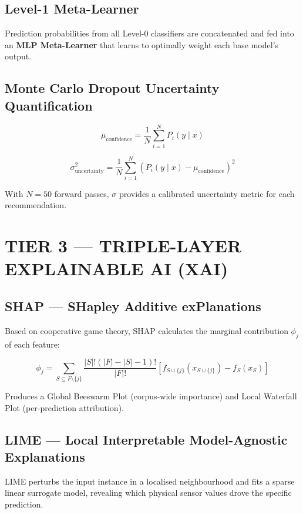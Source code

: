 \documentclass[12pt,a4paper,oneside]{report}
\begin{document}
\subsection{Level-1 Meta-Learner}
Prediction probabilities from all Level-0 classifiers are concatenated and fed into an \textbf{MLP Meta-Learner} that learns to optimally weight each base model's output.

\subsection{Monte Carlo Dropout Uncertainty Quantification}

\begin{equation}
\mu_{\text{confidence}} = \frac{1}{N}\sum_{i=1}^{N} P_i(y \mid x)
\end{equation}

\begin{equation}
\sigma_{\text{uncertainty}}^2 = \frac{1}{N}\sum_{i=1}^{N} \left(P_i(y \mid x) - \mu_{\text{confidence}}\right)^2
\end{equation}

With $N=50$ forward passes, $\sigma$ provides a calibrated uncertainty metric for each recommendation.

\section{TIER 3 --- TRIPLE-LAYER EXPLAINABLE AI (XAI)}

\subsection{SHAP --- SHapley Additive exPlanations}
Based on cooperative game theory, SHAP calculates the marginal contribution $\phi_j$ of each feature:

\begin{equation}
\phi_j = \sum_{S \subseteq F \setminus \{j\}} \frac{|S|!(|F|-|S|-1)!}{|F|!}
\left[ f_{S \cup \{j\}}(x_{S \cup \{j\}}) - f_S(x_S) \right]
\end{equation}

Produces a Global Beeswarm Plot (corpus-wide importance) and Local Waterfall Plot (per-prediction attribution).

\subsection{LIME --- Local Interpretable Model-Agnostic Explanations}
LIME perturbs the input instance in a localised neighbourhood and fits a sparse linear surrogate model, revealing which physical sensor values drove the specific prediction.
\end{document}

